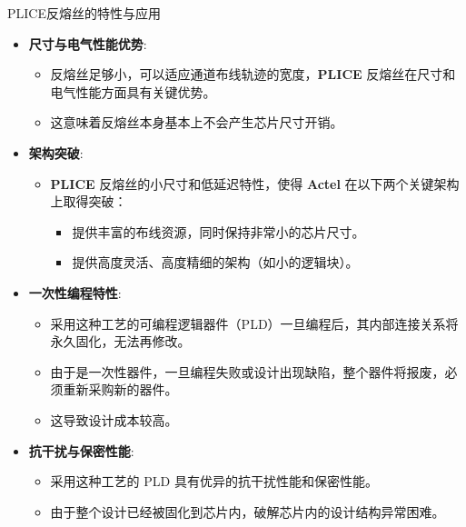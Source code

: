 \begin{frame}[allowframebreaks]{PLICE反熔丝的特性与应用}
\label{pliceux53cdux7194ux4e1dux7684ux7279ux6027ux4e0eux5e94ux7528}
\begin{itemize}
\tightlist
\item
    \textbf{尺寸与电气性能优势}:

    \begin{itemize}
    \tightlist
    \item
    反熔丝足够小，可以适应通道布线轨迹的宽度，\textbf{PLICE}
    反熔丝在尺寸和电气性能方面具有关键优势。
    \item
    这意味着反熔丝本身基本上不会产生芯片尺寸开销。
    \end{itemize}
\item
    \textbf{架构突破}:

    \begin{itemize}
    \tightlist
    \item
    \textbf{PLICE} 反熔丝的小尺寸和低延迟特性，使得 \textbf{Actel}
    在以下两个关键架构上取得突破：

    \begin{itemize}
    \tightlist
    \item
        提供丰富的布线资源，同时保持非常小的芯片尺寸。
    \item
        提供高度灵活、高度精细的架构（如小的逻辑块）。
    \end{itemize}
    \end{itemize}
    \pagebreak
\item
    \textbf{一次性编程特性}:

    \begin{itemize}
    \tightlist
    \item
    采用这种工艺的可编程逻辑器件（PLD）一旦编程后，其内部连接关系将永久固化，无法再修改。
    \item
    由于是一次性器件，一旦编程失败或设计出现缺陷，整个器件将报废，必须重新采购新的器件。
    \item
    这导致设计成本较高。
    \end{itemize}
\item
    \textbf{抗干扰与保密性能}:

    \begin{itemize}
    \tightlist
    \item
    采用这种工艺的 PLD 具有优异的抗干扰性能和保密性能。
    \item
    由于整个设计已经被固化到芯片内，破解芯片内的设计结构异常困难。
    \end{itemize}
\end{itemize}
\end{frame}

